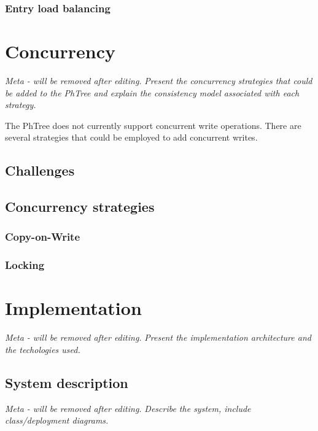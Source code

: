 \documentclass[11pt,a4paper]{globis-book}
\begin{document}
\subsection{Entry load balancing}

\chapter{Concurrency}
\label{ch:concurrency}

\textit{Meta - will be removed after editing.}
\textit{Present the concurrency strategies that could be added to the PhTree and explain the consistency model associated with each strategy.}

The PhTree does not currently support concurrent write operations. There are several strategies that could be employed to add concurrent writes.

\section{Challenges}

\section{Concurrency strategies}

\subsection{Copy-on-Write}

\subsection{Locking}

\chapter{Implementation}
\label{ch:implementation}

\textit{Meta - will be removed after editing.}
\textit{Present the implementation architecture and the techologies used.}

\section{System description}
\textit{Meta - will be removed after editing.}
\textit{Describe the system, include class/deployment diagrams.}
\end{document}
